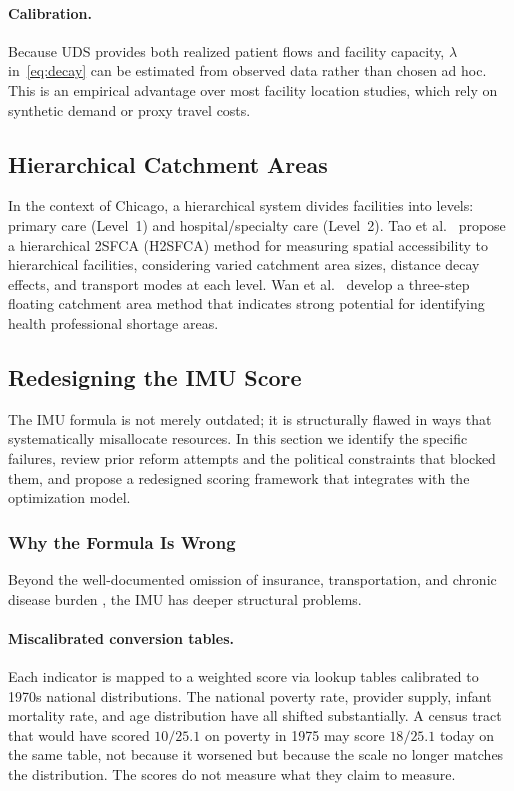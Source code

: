 \documentclass[11pt]{article}
\begin{document}
\paragraph{Calibration.}
Because UDS provides both realized patient flows and facility capacity, $\lambda$
in~\eqref{eq:decay} can be estimated from observed data rather than chosen ad hoc. This is an
empirical advantage over most facility location studies, which rely on synthetic demand or
proxy travel costs.


\subsection{Hierarchical Catchment Areas}

In the context of Chicago, a hierarchical system divides facilities into levels: primary care (Level~1) and hospital/specialty 
care (Level~2). Tao et al.\ \cite{tao2020hierarchical} propose a hierarchical 2SFCA (H2SFCA) method for measuring spatial 
accessibility to hierarchical facilities, considering varied catchment area sizes, distance decay effects, and transport modes 
at each level. Wan et al.\ \cite{wan2012three} develop a three-step floating catchment area method that indicates strong potential 
for identifying health professional shortage areas.


\subsection{Redesigning the IMU Score}\label{sec:new-imu}

The IMU formula is not merely outdated; it is structurally flawed in ways that
systematically misallocate resources. In this section we identify the specific
failures, review prior reform attempts and the political constraints that blocked
them, and propose a redesigned scoring framework that integrates with the
optimization model.


\subsubsection{Why the Formula Is Wrong}\label{sec:imu-wrong}

Beyond the well-documented omission of insurance, transportation, and chronic
disease burden \cite{ricketts2007designating}, the IMU has deeper structural
problems.

\paragraph{Miscalibrated conversion tables.}
Each indicator is mapped to a weighted score via lookup tables calibrated to
1970s national distributions. The national poverty rate, provider supply,
infant mortality rate, and age distribution have all shifted substantially.
A census tract that would have scored $10/25.1$ on poverty in 1975 may score
$18/25.1$ today on the same table, not because it worsened but because the
scale no longer matches the distribution. The scores do not measure what they
claim to measure.
\end{document}
